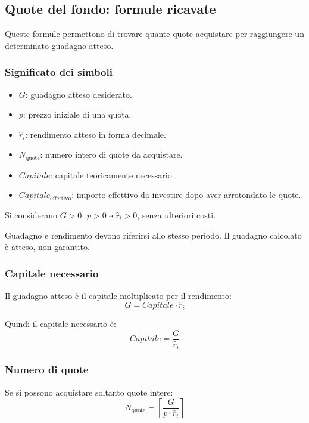 \subsection{Quote del fondo: formule ricavate}

\noindent
Queste formule permettono di trovare quante quote acquistare
per raggiungere un determinato guadagno atteso.

\subsubsection*{Significato dei simboli}

\begin{itemize}
    \item $G$: guadagno atteso desiderato.
    \item $p$: prezzo iniziale di una quota.
    \item $\widehat r_i$: rendimento atteso in forma decimale.
    \item $N_{\text{quote}}$: numero intero di quote da acquistare.
    \item $Capitale$: capitale teoricamente necessario.
    \item $Capitale_{\text{effettivo}}$: importo effettivo
        da investire dopo aver arrotondato le quote.
\end{itemize}

\noindent
Si considerano $G>0$, $p>0$ e $\widehat r_i>0$,
senza ulteriori costi.

\noindent
Guadagno e rendimento devono riferirsi allo stesso periodo.
Il guadagno calcolato è atteso, non garantito.

\subsubsection*{Capitale necessario}

\noindent
Il guadagno atteso è il capitale moltiplicato
per il rendimento:
\[
    G=Capitale\cdot\widehat r_i
\]

\noindent
Quindi il capitale necessario è:
\[
    Capitale=\frac{G}{\widehat r_i}
\]

\subsubsection*{Numero di quote}

\noindent
Se si possono acquistare soltanto quote intere:
\[
    N_{\text{quote}}
    =
    \left\lceil
        \frac{G}{p\cdot\widehat r_i}
    \right\rceil
\]

